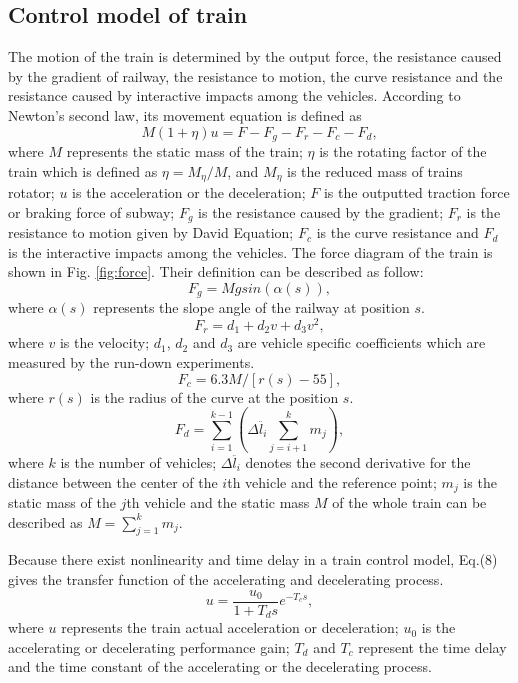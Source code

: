 \documentclass[journal]{IEEEtran}
\begin{document}
\subsection{Control model of train}
The motion of the train is determined by the output force, the resistance caused by the gradient of railway, the resistance to motion, the curve resistance and the resistance caused by interactive impacts among the vehicles. According to Newton's second law, its movement equation is defined as
\begin{equation}
M(1 + \eta)u = F - F_g - F_r - F_c - F_d,
\end{equation} 
where \(M\) represents the static mass of the train; $\eta$ is the rotating factor of the train which is defined as \(\eta =M_{\eta}/M\), and \(M_{\eta}\) is the reduced mass of trains rotator; \(u\) is the acceleration or the deceleration; \(F\) is the outputted traction force or braking force of subway; \(F_g\) is the resistance caused by the gradient; \(F_r\) is  the resistance to motion given by David Equation; \(F_c\) is the curve resistance and \(F_d\) is the interactive impacts among the vehicles. The force diagram of the train is shown in Fig. \ref{fig:force}. Their definition can be described as follow:
\begin{equation}
F_g = Mgsin(\alpha(s)),
\end{equation}  
where $\alpha(s)$ represents the slope angle of the railway at position \(s\).
\begin{equation}
F_r = d_1 + d_2v + d_3 v^2,
\end{equation} 
where  \(v\) is the velocity; \(d_1\), \(d_2\) and \(d_3\) are vehicle specific coefficients which are measured by the run-down experiments\cite{rochard2000review}.
\begin{equation}
F_c = 6.3 M / [r(s) - 55],
\end{equation} 
where \(r(s)\) is the radius of the curve at the position \(s\)\cite{wang2013optimal}.
\begin{equation}
F_d = \sum_{i=1}^{k-1} (\Delta \ddot{l_i} \sum_{j=i+1}^{k} m_j),
\end{equation} 
where \(k\) is the number of vehicles; \(\Delta \ddot{l_i}\) denotes the second derivative for the distance between the center of the \(i\)th vehicle and the reference point\cite{song2011computationally}; \(m_j\) is the static mass of the \(j\)th vehicle and the static mass \(M\) of the whole train can be described as \(M=\sum_{j=1}^{k}m_j\).
\par Because there exist nonlinearity and time delay in a train control model, Eq.(8) gives the transfer function of the accelerating and decelerating process\cite{chen2013online}.
\begin{equation}
u = \frac{u_0}{1 + T_d s} e^{-T_c s},
\end{equation}
where \(u\) represents the train actual acceleration or deceleration; \(u_0\) is the accelerating or decelerating performance gain; \(T_d\) and \(T_c\) represent the time delay and the time constant of the accelerating or the decelerating process.
\end{document}
